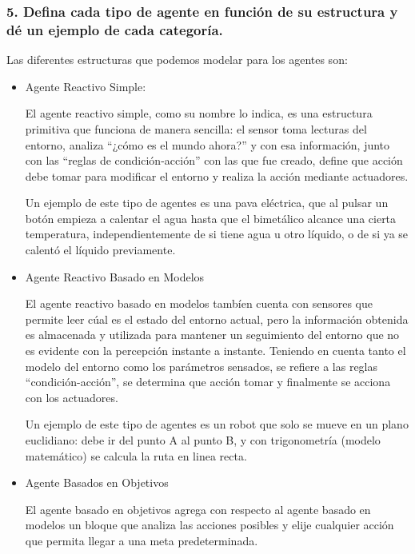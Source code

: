 \documentclass[11pt]{article}
\begin{document}
    \subsubsection{\texorpdfstring{5. Defina cada tipo de agente en función
de su \textbf{estructura} y dé un ejemplo de cada
categoría.}{5. Defina cada tipo de agente en función de su estructura y dé un ejemplo de cada categoría.}}\label{defina-cada-tipo-de-agente-en-funciuxf3n-de-su-estructura-y-duxe9-un-ejemplo-de-cada-categoruxeda.}

    Las diferentes estructuras que podemos modelar para los agentes son:

\begin{itemize}
\item
  Agente Reactivo Simple:

  El agente reactivo simple, como su nombre lo indica, es una estructura
  primitiva que funciona de manera sencilla: el sensor toma lecturas del
  entorno, analiza ``¿cómo es el mundo ahora?'' y con esa información,
  junto con las ``reglas de condición-acción'' con las que fue creado,
  define que acción debe tomar para modificar el entorno y realiza la
  acción mediante actuadores.

  Un ejemplo de este tipo de agentes es una pava eléctrica, que al
  pulsar un botón empieza a calentar el agua hasta que el bimetálico
  alcance una cierta temperatura, independientemente de si tiene agua u
  otro líquido, o de si ya se calentó el líquido previamente.
\item
  Agente Reactivo Basado en Modelos

  El agente reactivo basado en modelos tambíen cuenta con sensores que
  permite leer cúal es el estado del entorno actual, pero la información
  obtenida es almacenada y utilizada para mantener un seguimiento del
  entorno que no es evidente con la percepción instante a instante.
  Teniendo en cuenta tanto el modelo del entorno como los parámetros
  sensados, se refiere a las reglas ``condición-acción'', se determina
  que acción tomar y finalmente se acciona con los actuadores.

  Un ejemplo de este tipo de agentes es un robot que solo se mueve en un
  plano euclidiano: debe ir del punto A al punto B, y con trigonometría
  (modelo matemático) se calcula la ruta en linea recta.
\item
  Agente Basados en Objetivos

  El agente basado en objetivos agrega con respecto al agente basado en
  modelos un bloque que analiza las acciones posibles y elije cualquier
  acción que permita llegar a una meta predeterminada.


\end{itemize}
\end{document}
